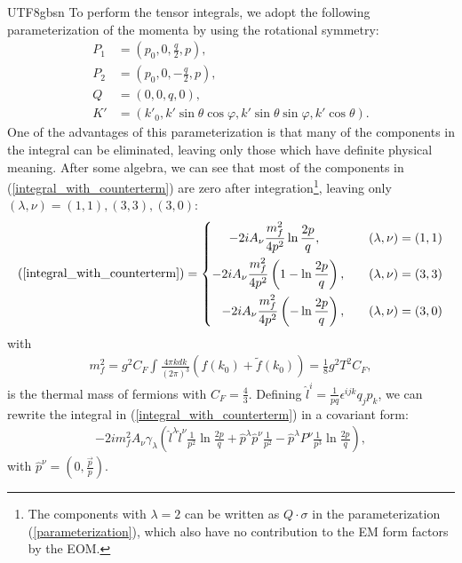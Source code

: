 \documentclass[11pt]{article}\def\baselinestretch{1.4}
\def\p{{\pi}}
\begin{document}
\begin{CJK}{UTF8}{gbsn}
To perform the tensor integrals, we adopt the following parameterization of the momenta by using the rotational symmetry:
\begin{align}
   P_1 &=(p_0, 0, \frac{q}{2}, p) ,\nonumber \\
   P_2 &=(p_0, 0, -\frac{q}{2}, p) ,\nonumber \\
   Q &=(0, 0, q, 0) ,\nonumber \\
   K' &=(k'_0, k' \sin{\theta } \cos{\varphi }, k' \sin{\theta } \sin{\varphi }, k' \cos{\theta }).\label{parameterization}
\end{align}
One of the advantages of this parameterization is that many of the components in the integral can be eliminated, leaving only those which have definite physical meaning.
After some algebra, we can see that most of the components in (\ref{integral_with_counterterm}) are zero after integration\footnote{The components with $\lambda = 2$ can be written as $Q\cdot \sigma$ in the parameterization (\ref{parameterization}), which also have no contribution to the EM form factors by the EOM.  }, leaving only $(\lambda, \nu)=(1, 1), (3, 3), (3, 0)$: 
\begin{align}
(\ref{integral_with_counterterm}) = \left\{
\begin{aligned}
-2i A_\nu \frac{m_f^2}{4p^2}\ln{\frac{2p}{q}}, \quad\quad\quad\quad   & (\lambda,\nu)=(1,1)  \\
-2i A_\nu \frac{m_f^2}{4p^2}\left(1-\ln{\frac{2p}{q}}\right), \quad\quad   & (\lambda,\nu)=(3,3)  \\
-2i A_\nu \frac{m_f^2}{4p^2}\left(-\ln{\frac{2p}{q}}\right), \quad\quad   & (\lambda,\nu)=(3,0)
\end{aligned}
\right.
\end{align}
with
\begin{align}
m_f^2=g^2C_F\int\frac{4\p kdk}{(2\pi)^3}\left(f(k_0)+\tilde{f}(k_0)\right)=\frac{1}{8}g^2 T^2 C_F,
\end{align}
is the thermal mass of fermions with $C_F=\frac{4}{3}$.
Defining $\hat{l}^i=\frac{1}{pq}\epsilon^{ijk}q_j p_k$, we can rewrite the integral in (\ref{integral_with_counterterm}) in a covariant form:
\begin{align}
-2i m_f^2 A_\nu \gamma _\lambda \left( \hat{l}^\lambda \hat{l}^\nu \frac{1}{p^2}\ln{\frac{2p}{q}} + \hat{p}^\lambda \hat{p}^\nu \frac{1}{p^2} - \hat{p}^\lambda P^\nu \frac{1}{p^3}\ln{\frac{2p}{q}} \right), \label{vertex_without_thermal_mass}
\end{align}
with $\hat{p}^\nu = (0,\frac{\vec{p}}{p})$.%
 

\end{CJK}
\end{document}
